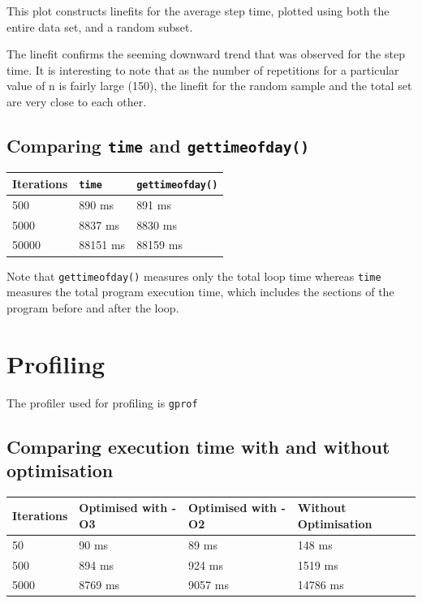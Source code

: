 \documentclass[11pt]{article}
\begin{document}
	This plot constructs linefits for the average step time, plotted using both the entire data set, and a random subset.
	
	The linefit confirms the seeming downward trend that was observed for the step time. It is interesting to note that as the number of repetitions for a particular value of n is fairly large (150), the linefit for the random sample and the total set are very close to each other.

\subsection{Comparing \texttt{time} and \texttt{gettimeofday()}}
	
	\vspace{0.5cm}

	\begin{center}
		\begin{tabular}{ | l | l | p{3cm} |}
			\hline
				Iterations & \texttt{time} & \texttt{gettimeofday()} \\ \hline
				500 & 890 ms & 891 ms \\ \hline
				5000 & 8837 ms & 8830 ms \\ \hline
				50000 & 88151 ms & 88159 ms \\ \hline
		\end{tabular}
	\end{center}

	Note that \texttt{gettimeofday()} measures only the total loop time whereas \texttt{time} measures the total program execution time, which includes the sections of the program before and after the loop.

\section{Profiling}

	The profiler used for profiling is \texttt{gprof}

\subsection{Comparing execution time with and without optimisation}

	\vspace{0.5cm}

	\begin{center}
		\begin{tabular}{ | l | l | l | l |}
			\hline
				Iterations & Optimised with -O3 & Optimised with -O2 & Without Optimisation \\ \hline
				50 & 90 ms & 89 ms & 148 ms \\ \hline
				500 & 894 ms & 924 ms & 1519 ms\\ \hline
				5000 & 8769 ms & 9057 ms & 14786 ms\\ \hline
		\end{tabular}
	\end{center}
\end{document}

